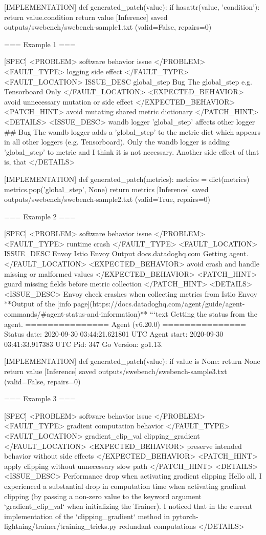 [IMPLEMENTATION]
def generated_patch(value):
if hasattr(value, 'condition'):
return value.condition
return value
[Inference] saved outputs/swebench/swebench-sample1.txt (valid=False, repairs=0)

=== Example 1 ===

[SPEC]
<PROBLEM> software behavior issue </PROBLEM> <FAULT_TYPE> logging side effect </FAULT_TYPE> <FAULT_LOCATION> ISSUE_DESC global_step Bug The global_step e.g. Tensorboard Only </FAULT_LOCATION> <EXPECTED_BEHAVIOR> avoid unnecessary mutation or side effect </EXPECTED_BEHAVIOR> <PATCH_HINT> avoid mutating shared metric dictionary </PATCH_HINT> <DETAILS> <ISSUE_DESC> wandb logger 'global_step' affects other logger ## Bug The wandb logger adds a 'global_step' to the metric dict which appears in all other loggers (e.g. Tensorboard). Only the wandb logger is adding 'global_step' to metric and I think it is not necessary. Another side effect of that is, that </DETAILS>

[IMPLEMENTATION]
def generated_patch(metrics):
metrics = dict(metrics)
metrics.pop('global_step', None)
return metrics
[Inference] saved outputs/swebench/swebench-sample2.txt (valid=True, repairs=0)

=== Example 2 ===

[SPEC]
<PROBLEM> software behavior issue </PROBLEM> <FAULT_TYPE> runtime crash </FAULT_TYPE> <FAULT_LOCATION> ISSUE_DESC Envoy Istio Envoy Output docs.datadoghq.com Getting agent. </FAULT_LOCATION> <EXPECTED_BEHAVIOR> avoid crash and handle missing or malformed values </EXPECTED_BEHAVIOR> <PATCH_HINT> guard missing fields before metric collection </PATCH_HINT> <DETAILS> <ISSUE_DESC> Envoy check crashes when collecting metrics from Istio Envoy **Output of the [info page](https://docs.datadoghq.com/agent/guide/agent-commands/#agent-status-and-information)** ```text Getting the status from the agent. =============== Agent (v6.20.0) =============== Status date: 2020-09-30 03:44:21.621801 UTC Agent start: 2020-09-30 03:41:33.917383 UTC Pid: 347 Go Version: go1.13.

[IMPLEMENTATION]
def generated_patch(value):
if value is None:
return None
return value
[Inference] saved outputs/swebench/swebench-sample3.txt (valid=False, repairs=0)

=== Example 3 ===

[SPEC]
<PROBLEM> software behavior issue </PROBLEM> <FAULT_TYPE> gradient computation behavior </FAULT_TYPE> <FAULT_LOCATION> gradient_clip_val clipping_gradient </FAULT_LOCATION> <EXPECTED_BEHAVIOR> preserve intended behavior without side effects </EXPECTED_BEHAVIOR> <PATCH_HINT> apply clipping without unnecessary slow path </PATCH_HINT> <DETAILS> <ISSUE_DESC> Performance drop when activating gradient clipping Hello all, I experienced a substantial drop in computation time when activating gradient clipping (by passing a non-zero value to the keyword argument `gradient_clip_val` when initializing the Trainer). I noticed that in the current implementation of the `clipping_gradient` method in pytorch-lightning/trainer/training_tricks.py redundant computations </DETAILS>

